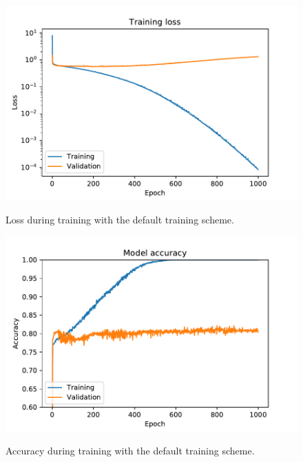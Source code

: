 \documentclass{kththesis}
\begin{document}
\begin{figure}
  \centering
  \includegraphics[width=0.9\linewidth]{img/loss_default.pdf}
  \label{fig:loss_default}
  \caption{Loss during training with the default training scheme.}
\end{figure}
\begin{figure}
  \centering
  \includegraphics[width=0.9\linewidth]{img/accuracy_default.pdf}
  \label{fig:accuracy_default}
  \caption{Accuracy during training with the default training scheme.}
\end{figure}
\end{document}
